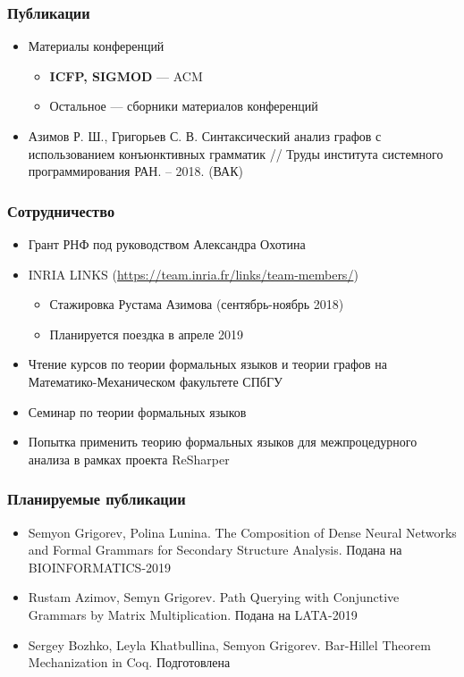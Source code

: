 \documentclass[xcolor=table]{beamer}
\begin{document}
\begin{frame}[fragile]
  \transwipe[direction=90]
  \frametitle{Публикации}
\begin{itemize}
      \item Материалы конференций
        \begin{itemize}
          \item \textbf{ICFP, SIGMOD} --- ACM
          \item Остальное --- сборники материалов конференций
        \end{itemize}
      \item Азимов Р. Ш., Григорьев С. В. Синтаксический анализ графов с использованием конъюнктивных грамматик // Труды института системного программирования РАН. – 2018. (ВАК)
\end{itemize}
\end{frame}

\begin{frame}[fragile]
  \transwipe[direction=90]
  \frametitle{Сотрудничество}
\begin{itemize}
      \item Грант РНФ под руководством Александра Охотина
      \item INRIA LINKS (\url{https://team.inria.fr/links/team-members/})
      \begin{itemize}
         \item Стажировка Рустама Азимова (сентябрь-ноябрь 2018)
         \item Планируется поездка в апреле 2019
      \end{itemize}
      \item Чтение курсов по теории формальных языков и теории графов на Математико-Механическом факультете СПбГУ
      \item Семинар по теории формальных языков
      \item Попытка применить теорию формальных языков для межпроцедурного анализа в рамках проекта ReSharper
      
\end{itemize}
\end{frame}

\begin{frame}[fragile]
  \transwipe[direction=90]
  \frametitle{Планируемые публикации}
\begin{itemize}
      \item Semyon Grigorev, Polina Lunina. The Composition of Dense Neural Networks and Formal Grammars for Secondary Structure Analysis. Подана на BIOINFORMATICS-2019
      \item Rustam Azimov, Semyn Grigorev. Path Querying with Conjunctive Grammars by Matrix Multiplication. Подана на LATA-2019
      \item Sergey Bozhko, Leyla Khatbullina, Semyon Grigorev. Bar-Hillel Theorem Mechanization in Coq. Подготовлена
\end{itemize}
\end{frame}
\end{document}
